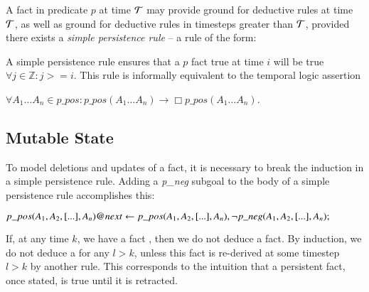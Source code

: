 A fact in predicate $p$ at time $\Tau$ may provide ground for deductive rules
at time $\Tau$, as well as ground for deductive rules in timesteps greater than $\Tau$,
provided there exists a {\em simple persistence rule} -- a rule of the form:



A simple persistence rule ensures that a $p$ fact true at time $i$ will be true
$\forall j \in \mathbb{Z} : j >= i$.  This rule is informally equivalent to the
temporal logic assertion

$\forall A_1 \ldots A_n \in p\_pos : p\_pos(A_1 \ldots A_n) \to \Box p\_pos(A_1
\ldots A_n)$.

\subsection{Mutable State}

To model deletions and updates of a fact, it is necessary to break the induction
in a simple persistence rule.  Adding a {\em p\_neg} subgoal to the body of a
simple persistence rule accomplishes this:

$p\_pos(A_1,A_2,[...],A_n)@next \leftarrow \\
p\_pos(A_1,A_2,[...],A_n), \\
\lnot p\_neg(A_1,A_2,[...],A_n);
$

%
%

If, at any time $k$, we have a fact
, then we do not deduce a
 fact.  By induction, we do not
deduce a  for any $l > k$, unless
this  fact is re-derived at some timestep $l > k$ by another
rule.  This corresponds to the intuition that a persistent fact, once stated,
is true until it is retracted.  

